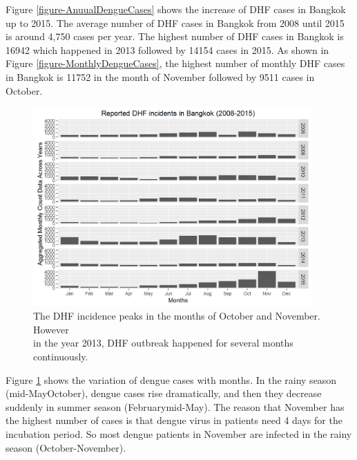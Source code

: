 \documentclass{bmcart}
\begin{document}
Figure \ref{figure-AnuualDengueCases} shows the increase of DHF cases in Bangkok up to 2015. The average number of  DHF cases in Bangkok from 2008 until 2015 is around 4,750 cases per year. The highest number of DHF cases in Bangkok is 16942 which happened in 2013 followed by 14154 cases in 2015. As shown in Figure \ref{figure-MonthlyDengueCases}, the highest number of monthly DHF cases in Bangkok is 11752 in the month of November followed by 9511 cases in October.


\begin{figure}[htbp]
	\begin{center}
		\includegraphics[width= 0.95\textwidth]{5-MonthlyDengueAcrossYears}
		\caption{The DHF incidence peaks in the months of October and November. However \\ in the year 2013, DHF outbreak happened for several months continuously.}
		\label{figure-MonthlyDengueAcrossYears}
	\end{center}
\end{figure}


Figure \ref{figure-MonthlyDengueAcrossYears} %
shows the variation of dengue cases with months. In the rainy season (mid-May\textendash October), dengue cases rise dramatically, and then they decrease suddenly in summer season (February\textemdash mid-May). The reason that November has the highest number of cases is that dengue virus in patients need 4 days for the incubation period. So most dengue patients in November are infected in the rainy season (October-November).  
\end{document}
